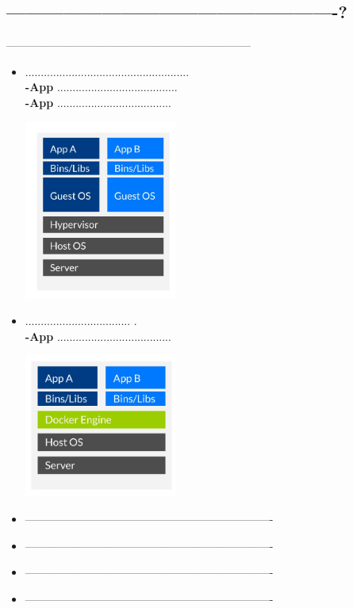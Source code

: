 \documentclass[twoside,twocolumn]{article}
\begin{document}
\subsection{----------------------------------------------------?}
------------------------------------------------------------------

\begin{itemize}
	\item .....................................................
	\\ \textbf{-App} .......................................
	\\ \textbf{-App} .....................................
	\begin{center}
	\includegraphics[width=5cm]{./Imagenes/jerarquia1} 
	\end{center}
\end{itemize} 

\begin{itemize}
	\item ..................................
.
	\\ \textbf{-App} .....................................
	\begin{center}
	\includegraphics[width=5cm]{./Imagenes/jerarquia2} 
	\end{center}
\end{itemize} 

\begin{itemize}
	\item -------------------------------------------------------------------
		\item -------------------------------------------------------------------
			\item -------------------------------------------------------------------
	\item -------------------------------------------------------------------



\end{itemize} 
\end{document}
